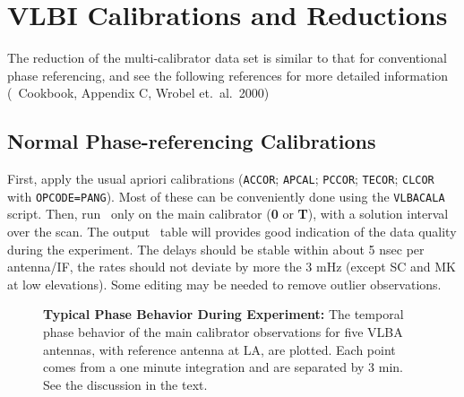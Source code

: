 \section {VLBI Calibrations and Reductions}

     The reduction of the multi-calibrator data set is similar to that
for conventional phase referencing, and see the following references
for more detailed information (\AIPS~Cookbook, Appendix C, Wrobel et.\
al.\ 2000)

\subsection {Normal Phase-referencing Calibrations}

First, apply the usual apriori calibrations ({\tt ACCOR}; {\tt APCAL};
{\tt PCCOR}; {\tt TECOR}; {\tt CLCOR} with {\tt OPCODE=PANG}).  Most
of these can be conveniently done using the {\tt VLBACALA} script.
Then, run \FR~only on the main calibrator ({\bf 0} or {\bf T}), with a
solution interval over the scan.  The output \SN\ table will provides
good indication of the data quality during the experiment.  The delays
should be stable within about 5 nsec per antenna/IF, the rates should
not deviate by more the 3 mHz (except SC and MK at low elevations).
Some editing may be needed to remove outlier observations.

\begin{figure}[t!]
\vskip -0.25in
\caption{\small{\bf Typical Phase Behavior During Experiment:} The
temporal phase behavior of the main calibrator observations for five
VLBA antennas, with reference antenna at LA, are plotted.  Each point
comes from a one minute integration and are separated by 3 min.  See
the discussion in the text.\normalsize}
\label{fig2}
\end{figure}

